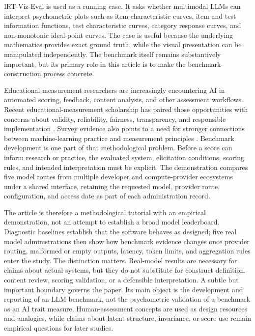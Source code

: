 \documentclass[12pt]{article}
\begin{document}
IRT-Viz-Eval is used as a running case. It asks whether multimodal LLMs can interpret psychometric plots such as item characteristic curves, item and test information functions, test characteristic curves, category response curves, and non-monotonic ideal-point curves. The case is useful because the underlying mathematics provides exact ground truth, while the visual presentation can be manipulated independently. The benchmark itself remains substantively important, but its primary role in this article is to make the benchmark-construction process concrete.

Educational measurement researchers are increasingly encountering AI in automated scoring, feedback, content analysis, and other assessment workflows. Recent educational-measurement scholarship has paired those opportunities with concerns about validity, reliability, fairness, transparency, and responsible implementation \citep{bulutzheng2024editorial,bulut2024rise,huang2025awe}. Survey evidence also points to a need for stronger connections between machine-learning practice and measurement principles \citep{zheng2025mxml}. Benchmark development is one part of that methodological problem. Before a score can inform research or practice, the evaluated system, elicitation conditions, scoring rules, and intended interpretation must be explicit. The demonstration compares five model routes from multiple developer and compute-provider ecosystems under a shared interface, retaining the requested model, provider route, configuration, and access date as part of each administration record.

The article is therefore a methodological tutorial with an empirical demonstration, not an attempt to establish a broad model leaderboard. Diagnostic baselines establish that the software behaves as designed; five real model administrations then show how benchmark evidence changes once provider routing, malformed or empty outputs, latency, token limits, and aggregation rules enter the study. The distinction matters. Real-model results are necessary for claims about actual systems, but they do not substitute for construct definition, content review, scoring validation, or a defensible interpretation. A subtle but important boundary governs the paper. Its main object is the development and reporting of an LLM benchmark, not the psychometric validation of a benchmark as an AI trait measure. Human-assessment concepts are used as design resources and analogies, while claims about latent structure, invariance, or score use remain empirical questions for later studies.
\end{document}

